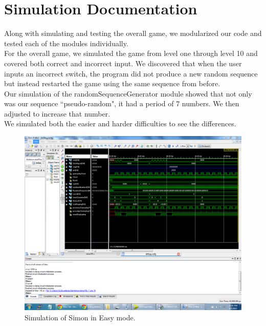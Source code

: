 \documentclass[]{article}
\begin{document}
\section{Simulation Documentation}

Along with simulating and testing the overall game, we modularized our code and tested each of the modules individually. \\

For the overall game, we simulated the game from level one through level 10 and covered both correct and incorrect input. We discovered that when the user inputs an incorrect switch, the program did not produce a new random sequence but instead restarted the game using the same sequence from before. \\

Our simulation of the randomSequenceGenerator module showed that not only was our sequence ``pseudo-random", it had a period of 7 numbers. We then adjusted to increase that number.\\

We simulated both the easier and harder difficulties to see the differences.\\


\begin{figure}[H]
\centering
\includegraphics[width=\textwidth]{EasyMode.PNG}
\caption{Simulation of Simon in Easy mode.}
\label{fig:easy}
\end{figure}
\end{document}
